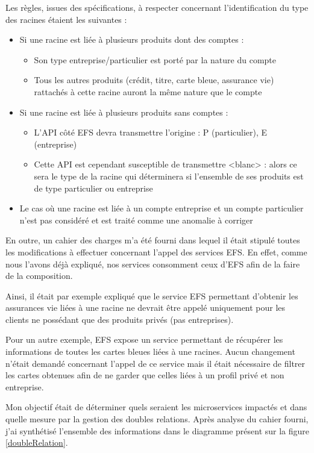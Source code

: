 	Les règles, issues des spécifications, à respecter concernant l'identification du type des racines étaient les suivantes :
	\begin{itemize}
		\item Si une racine est liée à plusieurs produits dont des comptes :
			\begin{itemize}
				\item Son type entreprise/particulier est porté par la nature du compte
				\item Tous les autres produits (crédit, titre, carte bleue, assurance vie) rattachés à cette racine auront la même nature que le compte
			\end{itemize}
		\item Si une racine est liée à plusieurs produits sans comptes :
			\begin{itemize}
				\item L’API côté EFS devra transmettre l’origine : P (particulier), E (entreprise)
				\item Cette API est cependant susceptible de transmettre <blanc> : alors ce sera le type de la racine qui déterminera si l’ensemble de ses produits est de type particulier ou entreprise
			\end{itemize}
		\item Le cas où une racine est liée à un compte entreprise et un compte particulier n’est pas considéré et est traité comme une anomalie à corriger \\
	\end{itemize}
	
	En outre, un cahier des charges m'a été fourni dans lequel il était stipulé toutes les modifications à effectuer concernant l'appel des services EFS. En effet, comme nous l'avons déjà expliqué, nos services consomment ceux d'EFS afin de la faire de la composition. 
	
	Ainsi, il était par exemple expliqué que le service EFS permettant d'obtenir les assurances vie liées à une racine ne devrait être appelé uniquement pour les clients ne possédant que des produits privés (pas entreprises). 
	
	Pour un autre exemple, EFS expose un service permettant de récupérer les informations de toutes les cartes bleues liées à une racines. Aucun changement n'était demandé concernant l'appel de ce service mais il était nécessaire de filtrer les cartes obtenues afin de ne garder que celles liées à un profil privé et non entreprise. 
	
	Mon objectif était de déterminer quels seraient les microservices impactés et dans quelle mesure par la gestion des doubles relations. Après analyse du cahier fourni, j'ai synthétisé l'ensemble des informations dans le diagramme présent sur la figure \ref{doubleRelation}. \\
	
